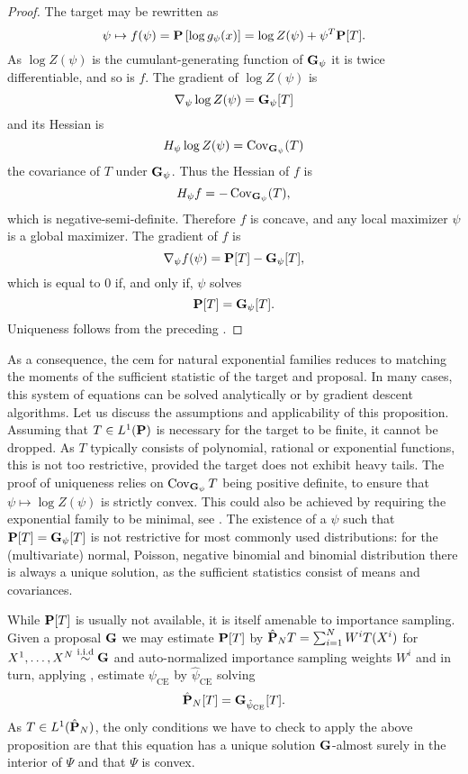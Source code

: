 \begin{proof}
    The target may be rewritten as
    $$
    \psi \mapsto f(\psi) = \P \left[\log g_{\psi}(x)\right]= \log Z(\psi) + \psi^{T} \P [T].
    $$
    As $\log Z(\psi)$ is the cumulant-generating function of $\G_{\psi}$ it is twice differentiable, and so is $f$. The gradient of $\log Z(\psi)$ is 
    $$
    \nabla_{\psi} \log Z(\psi) = \G_{\psi} [T]
    $$
    and its Hessian is 
    $$
    H_{\psi} \log Z(\psi) = \cov_{\G_{\psi}} (T)
    $$
    the covariance of $T$ under $\G_{\psi}$. Thus the Hessian of $f$ is 
    $$
    H_{\psi} f = - \cov_{\G_{\psi}} (T),
    $$
    which is negative-semi-definite. Therefore $f$ is concave, and any local maximizer $\psi$ is a global maximizer. The gradient of $f$ is 
    $$
        \nabla_{\psi} f(\psi) = \P[T] - \G_{\psi} [T],
    $$
    which is equal to $0$ if, and only if, $\psi$ solves 
    $$
    \P[T] = \G_{\psi}[T].
    $$
    Uniqueness follows from the preceding .
\end{proof}
As a consequence, the \acrshort{cem} for natural exponential families reduces to matching the moments of the sufficient statistic of the target and proposal.
In many cases, this system of equations can be solved analytically or by gradient descent algorithms.
Let us discuss the assumptions and applicability of this proposition. Assuming that $T \in L^{1}(\P)$ is necessary for the target to be finite, it cannot be dropped. As $T$ typically consists of polynomial, rational or exponential functions, this is not too restrictive, provided the target does not exhibit heavy tails. The proof of uniqueness relies on $\cov_{\G_{\psi}} T$ being positive definite, to ensure that $\psi \mapsto \log Z(\psi)$ is strictly convex. This could also be achieved by requiring the exponential family to be minimal, see \citep[Theorem 1.13 (iv)]{Brown1986Fundamentals}. The existence of a $\psi$ such that $\P [T] = \G_{\psi} [T]$ is not restrictive for most commonly used distributions: for the (multivariate) normal, Poisson, negative binomial and binomial distribution there is always a unique solution, as the sufficient statistics consist of means and covariances. 

While $\P [T]$ is usually not available, it is itself amenable to importance sampling. Given a proposal $\G$ we may estimate $\P [T]$ by $\hat\P_N T = \sum_{i = 1}^{N} W^{i} T(X^{i})$ for $X^{1}, \dots, X^{N} \iid \G$ and auto-normalized importance sampling weights $W^{i}$ and in turn, applying , estimate $\psi_{\text{CE}}$ by $\hat \psi_{\text{CE}}$ solving
\begin{equation}
    \label{eq:ee_hpce}
\hat \P_N [T] = \G_{\hpce} [T].
\end{equation}
As $T \in L^{1}(\hat \P_{N})$, the only conditions we have to check to apply the above proposition are that this equation has a unique solution $\G$-almost surely in the interior of $\Psi$ and that $\Psi$ is convex. 

